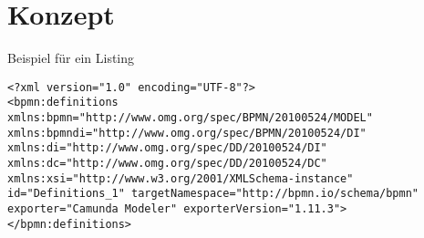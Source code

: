 \section{Konzept}
 Beispiel für ein Listing
\lstset{language=XML}
\begin{lstlisting}[caption={XML Definitionen},captionpos=b]
<?xml version="1.0" encoding="UTF-8"?>
<bpmn:definitions xmlns:bpmn="http://www.omg.org/spec/BPMN/20100524/MODEL" xmlns:bpmndi="http://www.omg.org/spec/BPMN/20100524/DI" xmlns:di="http://www.omg.org/spec/DD/20100524/DI" xmlns:dc="http://www.omg.org/spec/DD/20100524/DC" xmlns:xsi="http://www.w3.org/2001/XMLSchema-instance" id="Definitions_1" targetNamespace="http://bpmn.io/schema/bpmn" exporter="Camunda Modeler" exporterVersion="1.11.3">
</bpmn:definitions>
\end{lstlisting}
\label{sec:konzept}